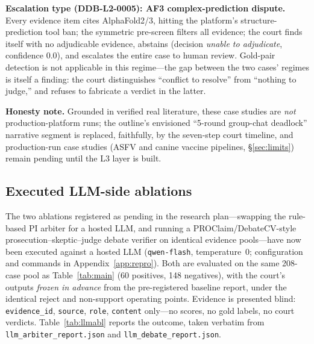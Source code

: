 \documentclass[11pt]{article}
\begin{document}
\textbf{Escalation type (DDB-L2-0005): AF3 complex-prediction dispute.}
Every evidence item cites AlphaFold2/3, hitting the platform's
structure-prediction tool ban; the symmetric pre-screen filters all
evidence; the court finds itself with no adjudicable evidence, abstains
(decision \emph{unable to adjudicate}, confidence $0.0$), and escalates the
entire case to human review. Gold-pair detection is not applicable in this
regime—the gap between the two cases' regimes is itself a finding: the
court distinguishes ``conflict to resolve'' from ``nothing to judge,''
and refuses to fabricate a verdict in the latter.

\textbf{Honesty note.} Grounded in verified real literature, these case
studies are \emph{not} production-platform runs; the outline's
envisioned ``5-round group-chat deadlock'' narrative segment is replaced,
faithfully, by the seven-step court timeline, and production-run case
studies (ASFV and canine vaccine pipelines, \S\ref{sec:limits}) remain
pending until the L3 layer is built.

\subsection{Executed LLM-side ablations}\label{sec:llmablation}

The two ablations registered as pending in the research plan---swapping the
rule-based PI arbiter for a hosted LLM, and running a PROClaim/DebateCV-style
prosecution--skeptic--judge debate verifier on identical evidence
pools---have now been executed against a hosted LLM
(\texttt{qwen-flash}, temperature~0; configuration and commands in
Appendix~\ref{app:repro}). Both are evaluated on the same 208-case pool as
Table~\ref{tab:main} (60 positives, 148 negatives), with the court's
outputs \emph{frozen in advance} from the pre-registered baseline report,
under the identical reject and non-support operating points. Evidence is
presented blind: \verb|evidence_id|, \verb|source|, \verb|role|,
\verb|content| only---no scores, no gold labels, no court verdicts.
Table~\ref{tab:llmabl} reports the outcome, taken verbatim from
\texttt{llm\_arbiter\_report.json} and \texttt{llm\_debate\_report.json}.
\end{document}
